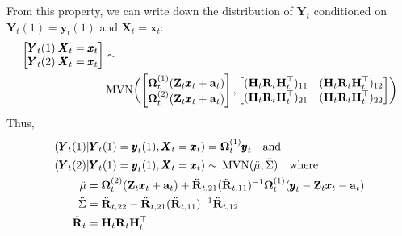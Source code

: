 \documentclass[]{article}
\def\OMG{\mbox{\boldmath $\Omega$}}
\def\XI{\mbox{\boldmath $\Xi$}}
\def\HH{\mbox{$\mathbf H$}}	\def\hh{\mbox{$\mathbf h$}}
\def\MVN{\,\textup{\textrm{MVN}}}
\def\RR{\mbox{$\mathbf R$}}	 \def\rr{\mbox{$\mathbf r$}} \def\Rb{\mbox{$\mathbf H$}}	\def\Rm{\mathbb{R}}
\def\XX{\mbox{$\pmb{X}$}}	\def\xx{\mbox{$\pmb{x}$}}
\def\YY{\mbox{$\pmb{Y}$}}	\def\yy{\mbox{$\pmb{y}$}}
\def\ZZ{\mbox{$\mathbf Z$}}	\def\zz{\mbox{$\mathbf z$}}	\def\Zb{\mbox{$\mathbf M$}} \def\Za{\mbox{$\mathbf N$}} \def\Zm{\XI}
\begin{document}
From this property, we can write down the distribution of $\YY_t$ conditioned on $\YY_t(1)=\yy_t(1)$ and $\XX_t=\xx_t$:
\begin{equation}
\begin{split}
\begin{bmatrix}
\YY_t(1)|\XX_t=\xx_t\\
\YY_t(2)|\XX_t=\xx_t
\end{bmatrix}
&\sim \\
&\MVN\biggl( \begin{bmatrix}
\OMG_t^{(1)}(\ZZ_t\xx_t+\aa_t)\\
\OMG_t^{(2)}(\ZZ_t\xx_t+\aa_t)
\end{bmatrix}, \begin{bmatrix}
(\HH_t\RR_t\HH_t^\top)_{11}&(\HH_t\RR_t\HH_t^\top)_{12}\\
(\HH_t\RR_t\HH_t^\top)_{21}&(\HH_t\RR_t\HH_t^\top)_{22}
\end{bmatrix}\biggr)
\end{split}
\end{equation}
Thus, 
\begin{equation}\label{eq:varY}
\begin{split}
(\YY_t(1)&|\YY_t(1)=\yy_t(1),\XX_t=\xx_t) = \OMG_t^{(1)}\yy_t\quad\text{and}\\
(\YY_t(2)&|\YY_t(1)=\yy_t(1),\XX_t=\xx_t) \sim \MVN(\ddot{\mu},\ddot{\Sigma})\quad\text{where}\\
\ddot{\mu}&= \OMG_t^{(2)}(\ZZ_t\xx_t+\aa_t)+\ddot{\RR}_{t,21}(\ddot{\RR}_{t,11})^{-1}\OMG_t^{(1)}(\yy_t-\ZZ_t\xx_t-\aa_t)\\
\ddot{\Sigma}&= \ddot{\RR}_{t,22} - \ddot{\RR}_{t,21}(\ddot{\RR}_{t,11})^{-1}\ddot{\RR}_{t,12} \\
\ddot{\RR}_t&= \HH_t\RR_t\HH_t^\top 
\end{split}
\end{equation}
\end{document}
